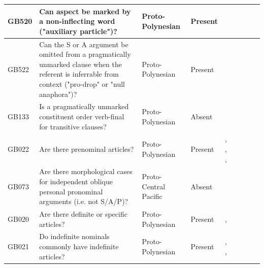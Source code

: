 \documentclass[a4paper,10pt]{article} %
\begin{document}
\begin{landscape}
\begin{longtable}{| p{2cm}| p{3cm}| p{2.5cm}|p{2cm}|p{2cm}|p{2cm}|p{2cm}|p{2cm}|p{2cm}|}
GB520&Can aspect be marked by a non-inflecting word ("auxiliary particle")?&Proto-Polynesian&Present&\citet[20]{chung1978}& \cellcolor{hedvig_lightgreen!50}{True Positive} & \cellcolor{hedvig_lightgreen!50}{True Positive} & \cellcolor{hedvig_lightgreen!50}{True Positive} & \cellcolor{hedvig_lightgreen!50}{True Positive} \\ \hline
GB522&Can the S or A argument be omitted from a pragmatically unmarked clause when the referent is inferrable from context ("pro-drop" or "null anaphora")?&Proto-Polynesian&Present&\citet[30]{chung1978}& \cellcolor{hedvig_lightgreen!50}{True Positive} & \cellcolor{hedvig_lightgreen!50}{True Positive} & \cellcolor{hedvig_lightgreen!50}{True Positive} & \cellcolor{hedvig_lightgreen!50}{True Positive} \\ \hline
GB133&Is a pragmatically unmarked constituent order verb-final for transitive clauses?&Proto-Polynesian&Absent&\citet[122]{kikusawa2002proto}& \cellcolor{hedvig_lightgreen!50}{True Negative} & \cellcolor{hedvig_yellow!50}{True Negative} & \cellcolor{hedvig_yellow!50}{True Negative} & \cellcolor{hedvig_yellow!50}{True Negative} \\ \hline
GB022&Are there prenominal articles?&Proto-Polynesian&Present&\citet[xiv]{clark1976aspects}, \citet[23]{chung1978}, \citet[53]{clark1976aspects} , \citet[136]{crowley1985common}& \cellcolor{hedvig_lightgreen!50}{True Positive} & \cellcolor{hedvig_lightgreen!50}{True Positive} & \cellcolor{hedvig_lightgreen!50}{True Positive} & \cellcolor{hedvig_lightgreen!50}{True Positive} \\ \hline
GB073&Are there morphological cases for independent oblique personal pronominal arguments (i.e. not S/A/P)?&Proto-Central Pacific&Absent&\citet[1]{kikusawa2002proto}& \cellcolor{hedvig_lightgreen!50}{True Negative} & \cellcolor{hedvig_yellow!50}{True Negative} & \cellcolor{hedvig_yellow!50}{True Negative} & \cellcolor{hedvig_yellow!50}{True Negative} \\ \hline
GB020&Are there definite or specific articles?&Proto-Polynesian&Present&\citet[23]{chung1978}, \citet[53]{clark1976aspects}& \cellcolor{hedvig_lightgreen!50}{True Positive} & \cellcolor{hedvig_yellow!50}{Half} & \cellcolor{hedvig_lightgreen!50}{True Positive} & \cellcolor{hedvig_lightgreen!50}{True Positive} \\ \hline
GB021&Do indefinite nominals commonly have indefinite articles?&Proto-Polynesian&Present&\citet[23]{chung1978}, \citet[53]{clark1976aspects}, \citet[73]{lynchrosscrowley_proto_grammar_oceanic}& \cellcolor{hedvig_lightgreen!50}{True Positive} & \cellcolor{hedvig_yellow!50}{False Negative} & \cellcolor{hedvig_lightgreen!50}{True Positive} & \cellcolor{hedvig_lightgreen!50}{True Positive} \\ \hline

\end{longtable}
\end{landscape}
\end{document}
